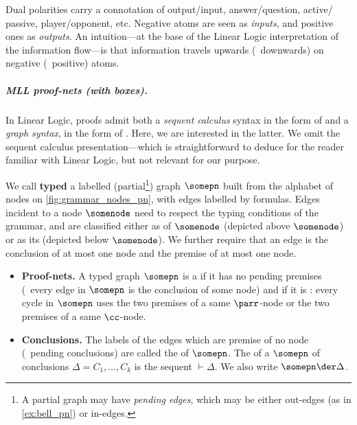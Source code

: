 \begin{remark}\label{rem:polarity}
Dual polarities carry a connotation of output/input, answer/question, active/ passive, player/opponent, etc.
Negative atoms are seen as \emph{inputs}, and positive ones as \emph{outputs}.
An intuition---at the base of the Linear Logic interpretation of the information flow---is that information travels upwards (\resp\ downwards) on negative (\resp\ positive) atoms.
\end{remark}

\subparagraph{MLL proof-nets (with boxes).}

In Linear Logic, proofs admit both a \emph{sequent calculus} syntax in the form of \textdef{\pts} and a \emph{graph syntax}, in the form of \textdef{\pn}.
Here, we are interested in the latter.
We omit the sequent calculus presentation---which is straightforward to deduce for the reader familiar with Linear Logic, but not relevant for our purpose.

\begin{definition}
\label{def:pn}
We call \textbf{typed} a labelled (partial\footnote{A partial graph may have \emph{pending edges}, which may be either out-edges (as in \cref{ex:bell_pn}) or in-edges.}) graph $\somepn$ built from the alphabet of nodes on \cref{fig:grammar_nodes_pn}, with edges labelled by \MLL formulas.
Edges incident to a node $\somenode$ need to respect the typing conditions of the grammar, and are classified either as  of $\somenode$ (depicted above $\somenode$) or as its  (depicted below $\somenode$).
We further require that an edge is the conclusion of at most one node and the premise of at most one node.
\begin{itemize}
\item
\textbf{Proof-nets.}
A typed graph $\somepn$ is a  if it has no pending premises (\ie\ every edge in $\somepn$ is the conclusion of some node) and if it is :
every cycle in $\somepn$ uses the two premises of a same $\parr$-node or the two premises of a same $\cc$-node.
\item
\textbf{Conclusions.}
The labels of the edges which are premise of no node (\aka\ pending conclusions) are called the  of $\somepn$.
The  of a \pn $\somepn$ of conclusions $\Delta=C_1, \dots, C_k$ is the sequent $\vdash \Delta$.
We also write $\somepn \der \Delta$.
\end{itemize}
\end{definition}

